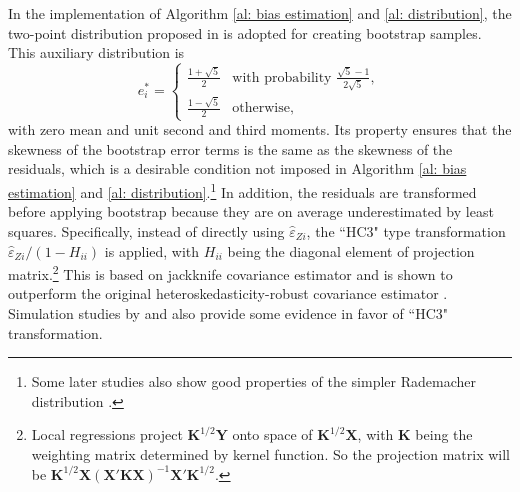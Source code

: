 \documentclass[12pt,]{article}
\DeclareMathOperator{\1}{\mathbbm{1}}
\begin{document}
In the implementation of Algorithm \ref{al: bias estimation} and \ref{al: distribution}, the two-point distribution proposed in \cite{mammen1993bootstrap} is adopted for creating bootstrap samples. This auxiliary distribution is
\begin{equation*}
e_i^* =
\begin{cases}
\frac{1 + \sqrt{5}}{2} & \text{with probability\ } \frac{\sqrt{5} - 1}{2 \sqrt{5}}, \\
\frac{1 - \sqrt{5}}{2} & \text{otherwise},
\end{cases}
\end{equation*}
with zero mean and unit second and third moments. Its property ensures that the skewness of the bootstrap error terms is the same as the skewness of the residuals, which is a desirable condition not imposed in Algorithm \ref{al: bias estimation} and \ref{al: distribution}.\footnote{Some later studies also show good properties of the simpler Rademacher distribution \citep{flachaire2005bootstrapping,davidson2008wild}.} In addition, the residuals are transformed before applying bootstrap because they are on average underestimated by least squares. Specifically, instead of directly using $\hat{\varepsilon}_{Zi}$, the ``HC3" type transformation $\hat{\varepsilon}_{Zi}/(1 - H_{ii})$ is applied, with $H_{ii}$ being the diagonal element of projection matrix.\footnote{Local regressions project $\mathbf{K}^{1/2} \mathbf{Y}$ onto space of $\mathbf{K}^{1/2} \mathbf{X}$, with $\mathbf{K}$ being the weighting matrix determined by kernel function. So the projection matrix will be $\mathbf{K}^{1/2} \mathbf{X} (\mathbf{X}' \mathbf{K} \mathbf{X})^{-1} \mathbf{X}' \mathbf{K}^{1/2}$.} This is based on jackknife covariance estimator and is shown to outperform the original heteroskedasticity-robust covariance estimator \citep{mackinnon1985some}. Simulation studies by \cite{davidson2008wild} and \cite{mackinnon2013thirty} also provide some evidence in favor of ``HC3" transformation.
\end{document}
